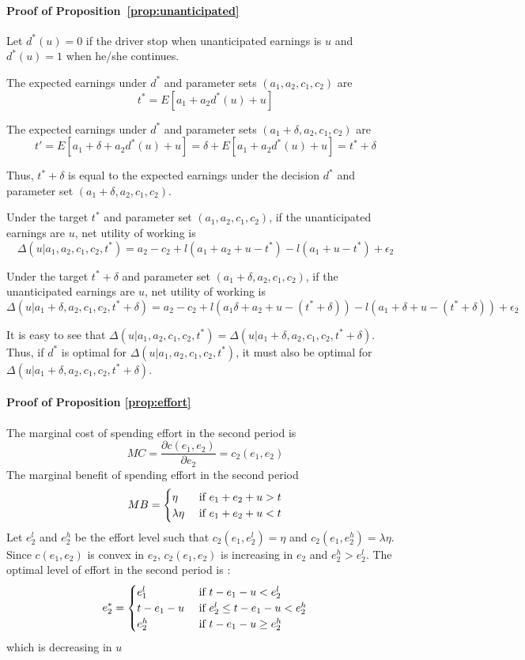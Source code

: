 \documentclass[reviewmode,AEJ]{AEA}
\begin{document}
\begin{appendices}
\paragraph{Proof of Proposition~\ref{prop:unanticipated}} Let $d^*(u) = 0$ if the driver stop when unanticipated earnings is $u$ and  $d^*(u) = 1$ when he/she continues.

The expected earnings under $d^*$ and parameter sets $(a_1, a_2, c_1, c_2)$ are 
\[t^* = E[a_1 + a_2d^*(u) + u]\]

The expected earnings under $d^*$ and parameter sets $(a_1+\delta, a_2, c_1, c_2)$ are
\[t' = E[a_1 + \delta + a_2d^*(u) + u] = \delta +E[a_1  + a_2d^*(u) + u] = t^* + \delta\]

Thus, $t^* + \delta$ is equal to the expected earnings under the decision $d^*$ and parameter set $(a_1+\delta, a_2, c_1, c_2)$.

Under the target $t^*$ and parameter set $(a_1, a_2, c_1, c_2)$, if the unanticipated earnings are $u$, net utility of working is 
\[\Delta(u|a_1, a_2, c_1, c_2, t^*) = a_2 - c_2 + l(a_1 + a_2 + u - t^*) -  l(a_1 + u - t^*) + \epsilon_2 \]


Under the target $t^*+\delta$ and parameter set $(a_1+\delta, a_2, c_1, c_2)$, if the unanticipated earnings are $u$, net utility of working is 
\[\Delta(u|a_1+\delta, a_2, c_1, c_2, t^*+\delta) = a_2  - c_2 + l(a_1 \delta + a_2 + u - (t^*+\delta)) -  l(a_1 + \delta + u - (t^*+\delta)) + \epsilon_2 \]

It is easy to see that \(\Delta(u|a_1, a_2, c_1, c_2, t^*)  = \Delta(u|a_1+\delta, a_2, c_1, c_2, t^*+\delta)\). Thus, if $d^*$ is optimal for \(\Delta(u|a_1, a_2, c_1, c_2, t^*) \), it must also be optimal for \(\Delta(u|a_1+\delta, a_2, c_1, c_2, t^*+\delta) \).


\paragraph{Proof of Proposition \ref{prop:effort}} The marginal cost of spending effort in the second period is 
\[MC = \frac{\partial c(e_1, e_2)}{\partial e_2} = c_2(e_1, e_2)\]
The marginal benefit of spending effort in the second period 
\[MB = \begin{cases}\eta &\hbox{ if } e_1+e_2+u > t\\\lambda\eta &\hbox{ if } e_1+e_2+u < t\end{cases}\]
Let $e_2^l$ and $e_2^h$ be the effort level such that $c_2(e_1, e_2^l) = \eta$ and $c_2(e_1, e_2^h) = \lambda\eta$. Since $c(e_1, e_2)$ is convex in $e_2$, $c_2(e_1, e_2)$ is increasing in $e_2$ and $e_2^h > e_2^l$.  The optimal level of effort in the second period is :
\[e_2^* = \begin{cases} e_1^l &\hbox{ if } t-e_1-u < e_2^l \\ t-e_1-u &\hbox{ if } e_2^l \leq t-e_1-u < e_2^h \\ e_2^h &\hbox{ if } t-e_1-u \geq e_2^h \end{cases}\]
which is decreasing in $u$



\end{appendices}
\end{document}
